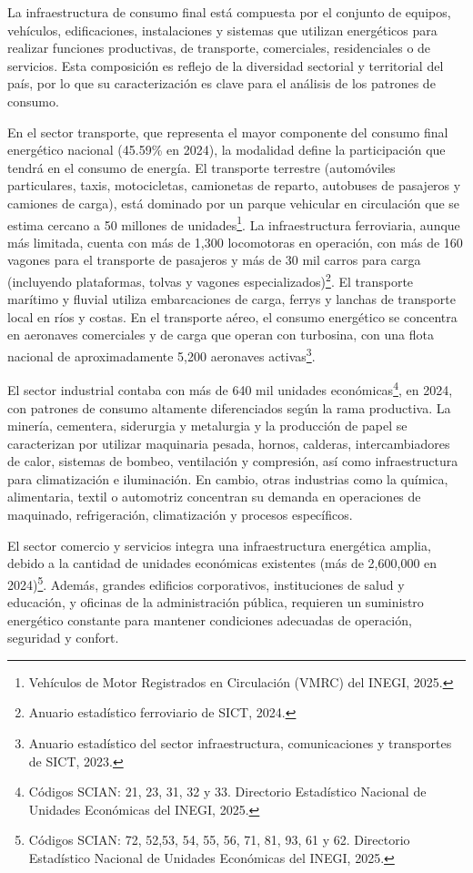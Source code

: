 \documentclass{sener2025}
\begin{document}
La infraestructura de consumo final está compuesta por el conjunto de equipos, vehículos, edificaciones, instalaciones y sistemas que utilizan energéticos para realizar funciones productivas, de transporte, comerciales, residenciales o de servicios. Esta composición es reflejo de la diversidad sectorial y territorial del país, por lo que su caracterización es clave para el análisis de los patrones de consumo.

En el sector transporte, que representa el mayor componente del consumo final energético nacional (45.59\% en 2024), la modalidad define la participación que tendrá en el consumo de energía. El transporte terrestre (automóviles particulares, taxis, motocicletas, camionetas de reparto, autobuses de pasajeros y camiones de carga), está dominado por un parque vehicular en circulación que se estima cercano a 50 millones de unidades\footnote{Vehículos de Motor Registrados en Circulación (VMRC) del INEGI, 2025.}. La infraestructura ferroviaria, aunque más limitada, cuenta con más de 1,300 locomotoras en operación, con más de 160 vagones para el transporte de pasajeros y más de 30 mil carros para carga (incluyendo plataformas, tolvas y vagones especializados)\footnote{Anuario estadístico ferroviario de SICT, 2024.}. El transporte marítimo y fluvial utiliza embarcaciones de carga, ferrys y lanchas de transporte local en ríos y costas. En el transporte aéreo, el consumo energético se concentra en aeronaves comerciales y de carga que operan con turbosina, con una flota nacional de aproximadamente 5,200 aeronaves activas\footnote{Anuario estadístico del sector infraestructura, comunicaciones y transportes de SICT, 2023.}.

El sector industrial contaba con más de 640 mil unidades económicas\footnote{Códigos SCIAN: 21, 23, 31, 32 y 33. Directorio Estadístico Nacional de Unidades Económicas del INEGI, 2025.}, en 2024, con patrones de consumo altamente diferenciados según la rama productiva. La minería, cementera, siderurgia y metalurgia y la producción de papel se caracterizan por utilizar maquinaria pesada, hornos, calderas, intercambiadores de calor, sistemas de bombeo, ventilación y compresión, así como infraestructura para climatización e iluminación. En cambio, otras industrias como la química, alimentaria, textil o automotriz concentran su demanda en operaciones de maquinado, refrigeración, climatización y procesos específicos.

El sector comercio y servicios integra una infraestructura energética amplia, debido a la cantidad de unidades económicas existentes (más de 2,600,000 en 2024)\footnote{Códigos SCIAN: 72, 52,53, 54, 55, 56, 71, 81, 93, 61 y 62. Directorio Estadístico Nacional de Unidades Económicas del INEGI, 2025.}. Además, grandes edificios corporativos, instituciones de salud y educación, y oficinas de la administración pública, requieren un suministro energético constante para mantener condiciones adecuadas de operación, seguridad y confort.
\end{document}
